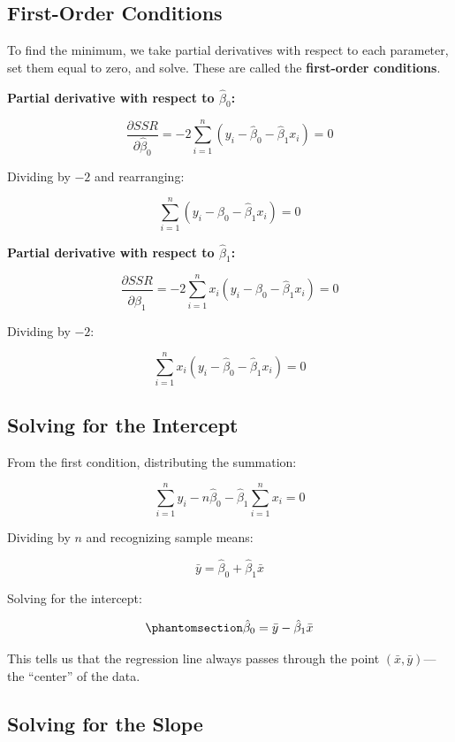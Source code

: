 \documentclass[
  letterpaper,
  DIV=11,
  numbers=noendperiod]{scrreprt}
\begin{document}
\subsection{First-Order Conditions}\label{first-order-conditions}

To find the minimum, we take partial derivatives with respect to each
parameter, set them equal to zero, and solve. These are called the
\textbf{first-order conditions}.

\textbf{Partial derivative with respect to \(\hat{\beta}_0\):}

\[
\frac{\partial SSR}{\partial \hat{\beta}_0} = -2 \sum_{i=1}^{n} (y_i - \hat{\beta}_0 - \hat{\beta}_1 x_i) = 0
\]

Dividing by \(-2\) and rearranging:

\[
\sum_{i=1}^{n} (y_i - \hat{\beta}_0 - \hat{\beta}_1 x_i) = 0
\]

\textbf{Partial derivative with respect to \(\hat{\beta}_1\):}

\[
\frac{\partial SSR}{\partial \hat{\beta}_1} = -2 \sum_{i=1}^{n} x_i(y_i - \hat{\beta}_0 - \hat{\beta}_1 x_i) = 0
\]

Dividing by \(-2\):

\[
\sum_{i=1}^{n} x_i(y_i - \hat{\beta}_0 - \hat{\beta}_1 x_i) = 0
\]

\subsection{Solving for the Intercept}\label{solving-for-the-intercept}

From the first condition, distributing the summation:

\[
\sum_{i=1}^{n} y_i - n\hat{\beta}_0 - \hat{\beta}_1 \sum_{i=1}^{n} x_i = 0
\]

Dividing by \(n\) and recognizing sample means:

\[
\bar{y} = \hat{\beta}_0 + \hat{\beta}_1 \bar{x}
\]

Solving for the intercept:

\begin{equation}\protect\phantomsection\label{eq-b0-formula}{
\hat{\beta}_0 = \bar{y} - \hat{\beta}_1 \bar{x}
}\end{equation}

This tells us that the regression line always passes through the point
\((\bar{x}, \bar{y})\)---the ``center'' of the data.

\subsection{Solving for the Slope}\label{solving-for-the-slope}
\end{document}
